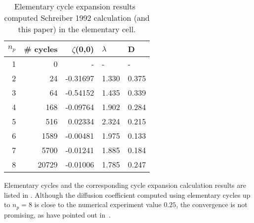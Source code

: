 
\begin{table}[htbp]
	\centering
	\begin{tabular}{|r|r|r|l|l|}
		\hline
		${n_p}$ & \# cycles & $\zeta$(0,0) & $\lambda$ & D \\ 
		\hline\hline
		1      & 0      &   -    &   -  &   - \\
		2      & 24     & -0.31697 & 1.330 & 0.375\\
		3      & 64     & -0.54152 & 1.435 & 0.339\\
		4      & 168    & -0.09764 & 1.902 & 0.284\\
		5      & 516    &  0.02334 & 2.324 & 0.215\\
		6      & 1589   & -0.00481 & 1.975 & 0.133\\
		7      & 5700   & -0.01241 & 1.885 & 0.184\\
		8      & 20729  & -0.01006 & 1.785 & 0.247\\ \hline
	\end{tabular}
	\caption[Elementary cell cycle expansion results of diffusion 
	coefficient]{\label{TCELL1}
		Elementary cycle expansion results~ computed
		Schreiber 1992 calculation (and this paper) in the
		elementary cell.}
\end{table}

Elementary cycles and the corresponding cycle expansion calculation
results are listed in . Although the diffusion
coefficient computed using elementary cycles up to $n_p = 8$ is close 
to the numerical experiment value $0.25$, the convergence is not
promising, as have pointed out in~.

